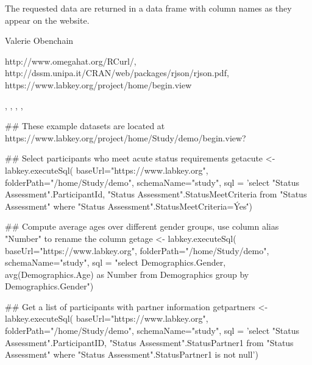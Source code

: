 \documentclass{book}
\begin{document}
\begin{Value}
The requested data are returned in a data frame with column names as they appear on the website.
\end{Value}
\begin{Author}\relax
Valerie Obenchain
\end{Author}
\begin{References}\relax
http://www.omegahat.org/RCurl/,\\ 
http://dssm.unipa.it/CRAN/web/packages/rjson/rjson.pdf,\\
https://www.labkey.org/project/home/begin.view
\end{References}
\begin{SeeAlso}\relax
{}, , , 
, 
\end{SeeAlso}
\begin{Examples}
\begin{ExampleCode}
## These example datasets are located at https://www.labkey.org/project/home/Study/demo/begin.view?

## Select participants who meet acute status requirements
getacute <- labkey.executeSql(
baseUrl="https://www.labkey.org",
folderPath="/home/Study/demo",
schemaName="study",
sql = 'select "Status Assessment".ParticipantId, "Status Assessment".StatusMeetCriteria 
from "Status Assessment" where "Status Assessment".StatusMeetCriteria=\'Yes\'')

## Compute average ages over different gender groups, use column alias "Number" to rename the column
getage <- labkey.executeSql(
baseUrl="https://www.labkey.org",
folderPath="/home/Study/demo",
schemaName="study",
sql = "select Demographics.Gender, avg(Demographics.Age) as Number from Demographics 
group by Demographics.Gender")

## Get a list of participants with partner information 
getpartners <- labkey.executeSql(
baseUrl="https://www.labkey.org",
folderPath="/home/Study/demo",
schemaName="study",
sql = 'select "Status Assessment".ParticipantID, "Status Assessment".StatusPartner1 
from "Status Assessment" where "Status Assessment".StatusPartner1 is not null')

\end{ExampleCode}
\end{Examples}
\end{document}
